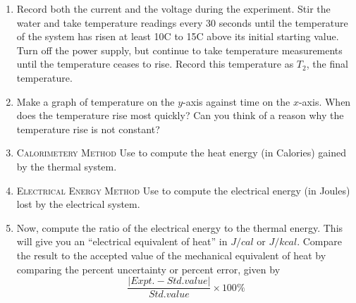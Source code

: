 \begin{enumerate}
\item
Record both the current and the voltage during the experiment.  Stir the water and take temperature readings every 30 seconds until the temperature of the system has risen at least 10\degree C to 15\degree C above its initial starting value.  Turn off the power supply, but continue to take temperature measurements until the temperature ceases to rise. Record this temperature as $T_2$, the final temperature.

\item
Make a graph of temperature on the $y$-axis against time on the $x$-axis.  When does the temperature rise most quickly?  Can you think of a reason why the temperature rise is not constant?

\item
\textsc{Calorimetery Method}  Use  to compute the heat energy (in Calories) gained by the thermal system. 

\item
\textsc{Electrical Energy Method}  Use  to compute the electrical energy (in Joules) lost by the electrical system.

\item
Now, compute the ratio of the electrical energy to the thermal energy.  This will give you an ``electrical equivalent of heat'' in $J/cal$ or $J/kcal$. Compare the result to the accepted value of the mechanical equivalent of heat by comparing the percent uncertainty or percent error, given by
\[ \frac{|Expt. - Std. value|}{Std. value} \times 100\% \]
\end{enumerate}


